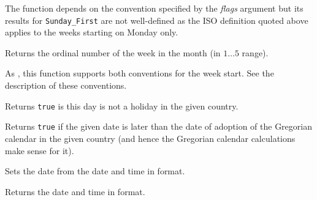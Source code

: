 The function depends on the  convention
specified by the {\it flags} argument but its results for
\texttt{Sunday\_First} are not well-defined as the ISO definition quoted above
applies to the weeks starting on Monday only.


\label{wxdatetimegetweekofmonth}


Returns the ordinal number of the week in the month (in $1\ldots5$  range).

As , this function supports
both conventions for the week start. See the description of these
 conventions.


\label{wxdatetimeisworkday}


Returns {\tt true} is this day is not a holiday in the given country.


\label{wxdatetimeisgregoriandate}


Returns {\tt true} if the given date is later than the date of adoption of the
Gregorian calendar in the given country (and hence the Gregorian calendar
calculations make sense for it).



\label{wxdatetimesetfromdos}


Sets the date from the date and time in
format.


\label{wxdatetimegetasdos}


Returns the date and time in
format.


